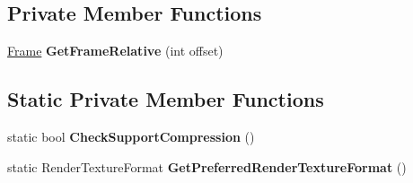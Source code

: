 \subsection*{Private Member Functions}
\begin{DoxyCompactItemize}
\item 
\mbox{\label{class_unity_engine_1_1_post_processing_1_1_motion_blur_component_1_1_frame_blending_filter_a6724ba674a7bb9aba4fd4911e92f8c9f}} 
\hyperlink{struct_unity_engine_1_1_post_processing_1_1_motion_blur_component_1_1_frame_blending_filter_1_1_frame}{Frame} {\bfseries Get\+Frame\+Relative} (int offset)
\end{DoxyCompactItemize}
\subsection*{Static Private Member Functions}
\begin{DoxyCompactItemize}
\item 
\mbox{\label{class_unity_engine_1_1_post_processing_1_1_motion_blur_component_1_1_frame_blending_filter_a9a271ef467db3a08ec81700817f04e09}} 
static bool {\bfseries Check\+Support\+Compression} ()
\item 
\mbox{\label{class_unity_engine_1_1_post_processing_1_1_motion_blur_component_1_1_frame_blending_filter_ae8b90f59aeb534b4f3d46cce8c944656}} 
static Render\+Texture\+Format {\bfseries Get\+Preferred\+Render\+Texture\+Format} ()
\end{DoxyCompactItemize}
